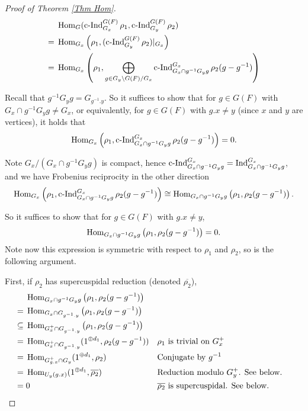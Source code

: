 		\begin{proof}[Proof of Theorem \ref{Thm Hom}]
			\begin{equation*}
				\begin{aligned}
					&\operatorname{\operatorname{Hom}}_G(\operatorname{\operatorname{c-Ind}}_{G_x}^{G(F)}\rho_1, \operatorname{\operatorname{c-Ind}}_{G_y}^{G(F)}\rho_2)\\
					=\;&\operatorname{\operatorname{Hom}}_{G_x}\left(\rho_1,(\operatorname{\operatorname{c-Ind}}_{G_y}^{G(F)}\rho_2)|_{G_x}\right)\\
					=\;& \operatorname{\operatorname{Hom}}_{G_x}\left(\rho_1, \bigoplus_{g \in {G_y\backslash G(F)/G_x}}\operatorname{\operatorname{c-Ind}}_{G_x \cap g^{-1}G_yg}^{G_x}\rho_2(g-g^{-1})\right)
				\end{aligned}
			\end{equation*}
			
			Recall that $g^{-1}G_yg=G_{g^{-1}.y}$. So it suffices to show that for $g \in G(F)$ with $G_x \cap g^{-1}G_yg \neq G_x$, or equivalently, for $g \in G(F)$ with $g.x \neq y$ (since $x$ and $y$ are vertices), it holds that
			$$\operatorname{\operatorname{Hom}}_{G_x}\left(\rho_1, \operatorname{\operatorname{c-Ind}}_{G_x \cap g^{-1}G_yg}^{G_x}\rho_2(g-g^{-1})\right)=0.$$
			
			Note $G_x/(G_x \cap g^{-1}G_yg)$ is compact, hence $\operatorname{\operatorname{c-Ind}}_{G_x \cap g^{-1}G_yg}^{G_x}=\operatorname{Ind}_{G_x \cap g^{-1}G_yg}^{G_x}$, and we have Frobenius reciprocity in the other direction
			$$\operatorname{\operatorname{Hom}}_{G_x}\left(\rho_1, \operatorname{\operatorname{c-Ind}}_{G_x \cap g^{-1}G_yg}^{G_x}\rho_2(g-g^{-1})\right) \cong \operatorname{\operatorname{Hom}}_{G_x \cap g^{-1}G_yg}\left(\rho_1, \rho_2(g-g^{-1})\right).$$
			
			So it suffices to show that for $g \in G(F)$ with $g.x \neq y$,
			$$\operatorname{\operatorname{Hom}}_{G_x \cap g^{-1}G_yg}\left(\rho_1, \rho_2(g-g^{-1})\right)=0.$$
			Note now this expression is symmetric with respect to $\rho_1$ and $\rho_2$, so is the following argument.
			
			First, if $\rho_2$ has supercuspidal reduction (denoted $\overline{\rho_2}$),
			\begin{align*}    	
				& \Hom_{G_x \cap g^{-1}G_yg}\left(\rho_1, \rho_2(g-g^{-1})\right) \\
				=\;& \Hom_{G_x \cap G_{g^{-1}.y}}\left(\rho_1, \rho_2(g-g^{-1})\right) \\
				\subseteq\;& \Hom_{G_x^+ \cap G_{g^{-1}.y}}\left(\rho_1, \rho_2(g-g^{-1})\right) && %
				\\
				=\;& \Hom_{G_x^+ \cap G_{g^{-1}.y}}(1^{\oplus d_1}, \rho_2(g-g^{-1})) && \text{$\rho_1$ is trivial on $G_x^+$ }\\
				=\;& \Hom_{G_{g.x}^+ \cap G_y}(1^{\oplus d_1}, \rho_2) && \text{Conjugate by $g^{-1}$}\\
				=\;& \Hom_{U_y(g.x)}(1^{\oplus d_1}, \overline{\rho_2}) && \text{Reduction modulo $G_y^+$. See below.}\\
				=\;& 0 && \text{$\overline{\rho_2}$ is supercuspidal. See below.}
			\end{align*}
			

\end{proof}
